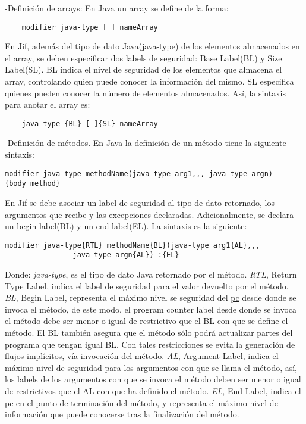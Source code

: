 -Definición de arrays:\newline
En Java un array se define de la forma:
\begin{lstlisting}
	modifier java-type [ ] nameArray
\end{lstlisting}
En Jif, además del tipo de dato Java(java-type) de los elementos almacenados en
el array, se deben especificar dos labels de seguridad: Base Label(BL) y Size
Label(SL). BL indica el nivel de seguridad de los elementos que almacena el
array, controlando quien puede conocer la información del mismo. SL especifica
quienes pueden conocer la número de elementos almacenados. Así, la sintaxis para
anotar el array es:
\begin{lstlisting}
	java-type {BL} [ ]{SL} nameArray
\end{lstlisting}

-Definición de métodos.\newline
En Java la definición de un método tiene la siguiente sintaxis:
\begin{lstlisting}
modifier java-type methodName(java-type arg1,,, java-type argn)
{body method}
\end{lstlisting}
En Jif se debe asociar un label de seguridad al tipo de dato retornado, los
argumentos que recibe y las excepciones declaradas.
Adicionalmente, se declara un begin-label(BL) y un end-label(EL). La sintaxis es
la siguiente:
\begin{lstlisting}
modifier java-type{RTL} methodName{BL}(java-type arg1{AL},,,
				java-type argn{AL}) :{EL}
\end{lstlisting}
Donde: \emph{java-type}, es el tipo de dato Java retornado por el
método.\newline 
\emph{RTL}, Return Type Label, indica el label de seguridad para el valor
devuelto por el método.\newline 
\emph{BL}, Begin Label, representa el máximo nivel se seguridad del
\underline{pc} desde donde se invoca el método, de este modo,
el program counter label desde donde se invoca el método debe ser menor o igual
de restrictivo que el BL con que se define el método. El BL también asegura que
el método sólo podrá actualizar partes del programa que tengan igual BL. Con
tales restricciones se evita la generación de flujos implícitos, vía invocación
del método.\newline
\emph{AL}, Argument Label, indica el máximo nivel de seguridad para los
argumentos con que se llama el método, así, los labels de los argumentos con que se
invoca el método deben ser menor o igual de restrictivos que el AL con que ha
definido el método.\newline 
\emph{EL}, End Label, indica el \underline{pc} en el punto de terminación del
método, y representa el máximo nivel de información que puede conocerse tras la
finalización del método.

